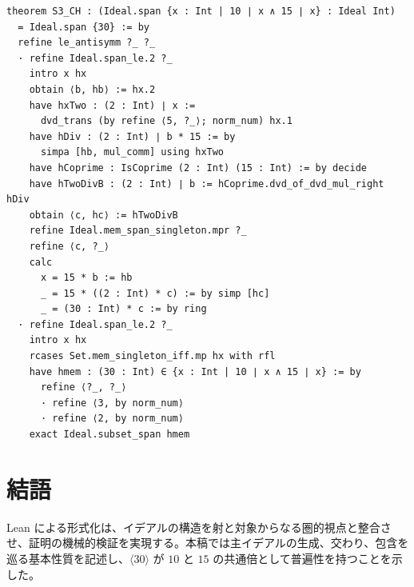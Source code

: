\documentclass[a4paper]{ltjsarticle}
\theoremstyle{definition}
\theoremstyle{plain}
\theoremstyle{remark}
\begin{document}
\begin{verbatim}
theorem S3_CH : (Ideal.span {x : Int | 10 ∣ x ∧ 15 ∣ x} : Ideal Int)
  = Ideal.span {30} := by
  refine le_antisymm ?_ ?_
  · refine Ideal.span_le.2 ?_
    intro x hx
    obtain ⟨b, hb⟩ := hx.2
    have hxTwo : (2 : Int) ∣ x :=
      dvd_trans (by refine ⟨5, ?_⟩; norm_num) hx.1
    have hDiv : (2 : Int) ∣ b * 15 := by
      simpa [hb, mul_comm] using hxTwo
    have hCoprime : IsCoprime (2 : Int) (15 : Int) := by decide
    have hTwoDivB : (2 : Int) ∣ b := hCoprime.dvd_of_dvd_mul_right hDiv
    obtain ⟨c, hc⟩ := hTwoDivB
    refine Ideal.mem_span_singleton.mpr ?_
    refine ⟨c, ?_⟩
    calc
      x = 15 * b := hb
      _ = 15 * ((2 : Int) * c) := by simp [hc]
      _ = (30 : Int) * c := by ring
  · refine Ideal.span_le.2 ?_
    intro x hx
    rcases Set.mem_singleton_iff.mp hx with rfl
    have hmem : (30 : Int) ∈ {x : Int | 10 ∣ x ∧ 15 ∣ x} := by
      refine ⟨?_, ?_⟩
      · refine ⟨3, by norm_num⟩
      · refine ⟨2, by norm_num⟩
    exact Ideal.subset_span hmem
\end{verbatim}

\section*{結語}
Lean による形式化は、イデアルの構造を射と対象からなる圏的視点と整合させ、証明の機械的検証を実現する。本稿では主イデアルの生成、交わり、包含を巡る基本性質を記述し、$\langle 30 \rangle$ が $10$ と $15$ の共通倍として普遍性を持つことを示した。
\end{document}
